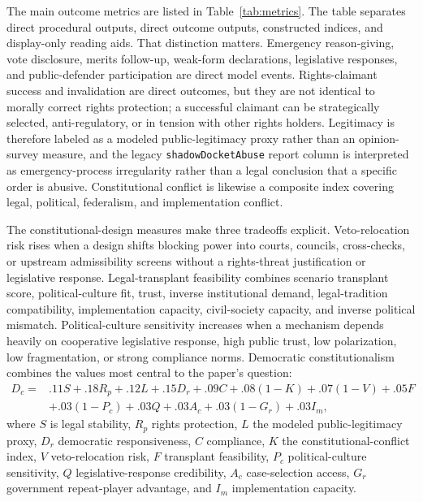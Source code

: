 \documentclass[
  journal=small,
  manuscript=research-article,
  year=2026
]{cup-journal}
\begin{document}
The main outcome metrics are listed in Table~\ref{tab:metrics}. The table separates direct procedural outputs, direct outcome outputs, constructed indices, and display-only reading aids. That distinction matters. Emergency reason-giving, vote disclosure, merits follow-up, weak-form declarations, legislative responses, and public-defender participation are direct model events. Rights-claimant success and invalidation are direct outcomes, but they are not identical to morally correct rights protection; a successful claimant can be strategically selected, anti-regulatory, or in tension with other rights holders. Legitimacy is therefore labeled as a modeled public-legitimacy proxy rather than an opinion-survey measure, and the legacy \texttt{shadowDocketAbuse} report column is interpreted as emergency-process irregularity rather than a legal conclusion that a specific order is abusive. Constitutional conflict is likewise a composite index covering legal, political, federalism, and implementation conflict.

The constitutional-design measures make three tradeoffs explicit. Veto-relocation risk rises when a design shifts blocking power into courts, councils, cross-checks, or upstream admissibility screens without a rights-threat justification or legislative response. Legal-transplant feasibility combines scenario transplant score, political-culture fit, trust, inverse institutional demand, legal-tradition compatibility, implementation capacity, civil-society capacity, and inverse political mismatch. Political-culture sensitivity increases when a mechanism depends heavily on cooperative legislative response, high public trust, low polarization, low fragmentation, or strong compliance norms. Democratic constitutionalism combines the values most central to the paper's question:
\[
\begin{aligned}
D_c={}&.11S+.18R_p+.12L+.15D_r+.09C+.08(1-K)+.07(1-V)+.05F\\
&+.03(1-P_c)+.03Q+.03A_c+.03(1-G_r)+.03I_m,
\end{aligned}
\]
where $S$ is legal stability, $R_p$ rights protection, $L$ the modeled public-legitimacy proxy, $D_r$ democratic responsiveness, $C$ compliance, $K$ the constitutional-conflict index, $V$ veto-relocation risk, $F$ transplant feasibility, $P_c$ political-culture sensitivity, $Q$ legislative-response credibility, $A_c$ case-selection access, $G_r$ government repeat-player advantage, and $I_m$ implementation capacity.
\end{document}
